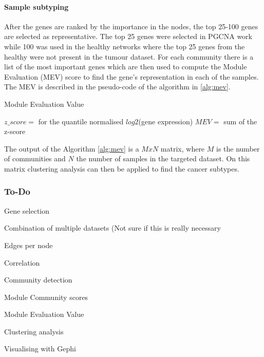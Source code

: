\paragraph{Sample subtyping}

After the genes are ranked by the importance in the nodes, the top 25-100 genes are selected as representative. The top 25 genes were selected in PGCNA work \cite{Care2019-ij} while 100 was used in the healthy networks where the top 25 genes from the healthy were not present in the tumour dataset. For each community there is a list of the most important genes which are then used to compute the Module Evaluation (MEV) score \citet{Care2019-ij} to find the gene's representation in each of the samples. The MEV is described in the pseudo-code of the algorithm in \ref{alg:mev}.

\begin{algorithm}
\caption{Module Evaluation Value }\label{alg:mev}
    \begin{algorithmic}
            \State $z\_score=$ for the quantile normalised $log2$(gene expression)
                \State $MEV=$ sum of the z-score  
            \EndFor
        \EndFor
    \EndFor
    \end{algorithmic}
\end{algorithm}

The output of the Algorithm \ref{alg:mev} is a $MxN$ matrix, where $M$ is the number of communities and $N$ the number of samples in the targeted dataset. On this matrix clustering analysis can then be applied to find the cancer subtypes.

\subsubsection{To-Do}
\begin{todolist}
    \item Gene selection
    \item Combination of multiple datasets (Not sure if this is really necessary
    \item [\done] Edges per node
    \item [\done] Correlation
    \item [\done] Community detection
    \item [\done] Module Community scores
    \item [\done] Module Evaluation Value
    \item Clustering analysis
    \item Visualising with Gephi
\end{todolist}
